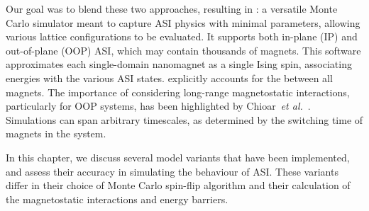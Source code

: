 Our goal was to blend these two approaches, resulting in \hotspice: a versatile Monte Carlo simulator meant to capture ASI physics with minimal parameters, allowing various lattice configurations to be evaluated.
It supports both in-plane (IP) and out-of-plane (OOP) ASI, which may contain thousands of magnets. 
This software approximates each single-domain nanomagnet as a single Ising spin, associating energies with the various ASI states.
\hotspice explicitly accounts for the  between all magnets.
The importance of considering long-range magnetostatic interactions, particularly for OOP systems, has been highlighted by Chioar~\textit{et al.}~\cite{Chioar2014}.
Simulations can span arbitrary timescales, as determined by the switching time of magnets in the system. \\\par

In this chapter, we discuss several model variants that have been implemented, and assess their accuracy in simulating the behaviour of ASI.
These variants differ in their choice of Monte Carlo spin-flip algorithm and their calculation of the magnetostatic interactions and energy barriers. \\\par

